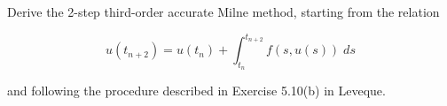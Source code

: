 Derive the 2-step third-order accurate Milne method, starting from the relation

$$
u(t_{n+2}) = u(t_n) + \int_{t_n}^{t_{n+2}}{f(s, u(s))\; ds}
$$

and following the procedure described in Exercise 5.10(b) in Leveque.

\begin{solution}\ \\\\
    \ \\
\end{solution}